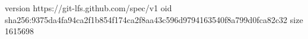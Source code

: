 version https://git-lfs.github.com/spec/v1
oid sha256:9375da4fa94ca2f1b854f174ca2f8aa43c596d9794163540f8a799d0fca82c32
size 1615698
